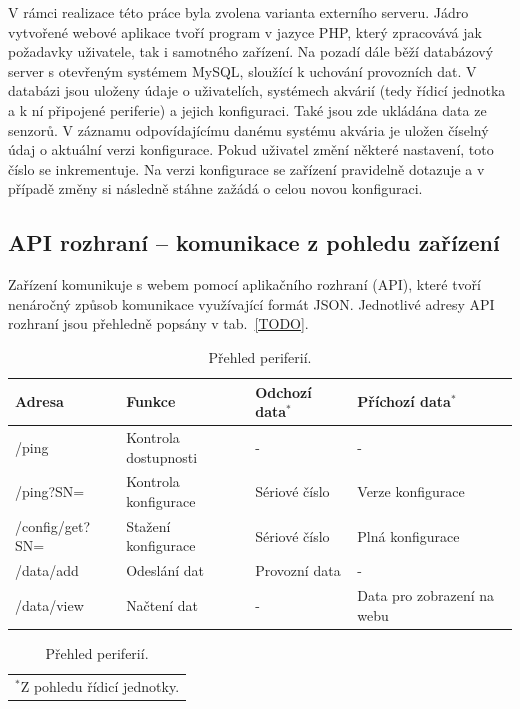     V rámci realizace této práce byla zvolena varianta externího serveru. Jádro vytvořené webové aplikace tvoří program v jazyce PHP, který zpracovává jak požadavky uživatele, tak i samotného zařízení. Na pozadí dále běží databázový server s otevřeným systémem MySQL, sloužící k uchování provozních dat. V databázi jsou uloženy údaje o uživatelích, systémech akvárií (tedy řídicí jednotka a k ní připojené periferie) a jejich konfiguraci. Také jsou zde ukládána data ze senzorů. V záznamu odpovídajícímu danému systému akvária je uložen číselný údaj o aktuální verzi konfigurace. Pokud uživatel změní některé nastavení, toto číslo se inkrementuje. Na verzi konfigurace se zařízení pravidelně dotazuje a v případě změny si následně stáhne zažádá o celou novou konfiguraci.

    \subsection{API rozhraní -- komunikace z pohledu zařízení}
    Zařízení komunikuje s webem pomocí aplikačního rozhraní (API), které tvoří nenáročný způsob komunikace využívající formát JSON. Jednotlivé adresy API rozhraní jsou přehledně popsány v tab.~\ref{TODO}. 

    \begin{table}[h]
        \centering
        \caption{Přehled periferií.}
        \label{tab:prehled-periferii}
        \begin{tabular}{|l|l|l|l|}
            \hline
            Adresa & Funkce & Odchozí data\(^{*}\)  & Příchozí data\(^{*}\)  \\ \hline\hline
           
            /ping & Kontrola dostupnosti & - & -  \\ \hline
            /ping?SN= & Kontrola konfigurace & Sériové číslo & Verze konfigurace  \\ \hline
            /config/get?SN= & Stažení konfigurace & Sériové číslo & Plná konfigurace  \\ \hline
            /data/add & Odeslání dat & Provozní data & -  \\ \hline
            /data/view & Načtení dat & - & Data pro zobrazení na webu  \\ \hline
            \end{tabular}
            \begin{tabular}{c}
                \(^{*}\)Z pohledu  řídicí jednotky.
            \end{tabular}   
    \end{table}

